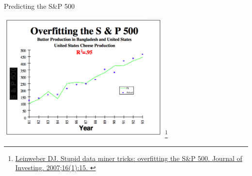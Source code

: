\documentclass[aspectratio=169]{beamer}
\begin{document}
\begin{frame}{Predicting the S\&P 500}

\includegraphics[width=0.65\textwidth]{./lectReg/butter2.png}
\footnote{\url{Leinweber DJ. Stupid data miner tricks: overfitting the S&P 500. Journal of Investing. 2007;16(1):15.
}}
\end{frame}
\end{document}
